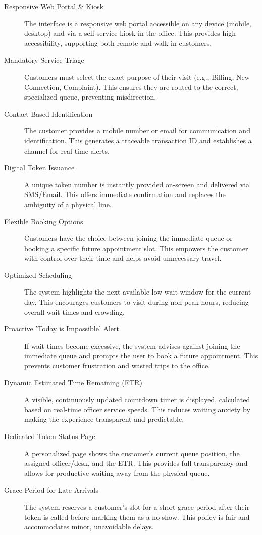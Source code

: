 \documentclass[12pt,a4paper]{report}
\begin{document}
\begin{description}
    \item[Responsive Web Portal \& Kiosk] The interface is a responsive web portal accessible on any device (mobile, desktop) and via a self-service kiosk in the office. This provides high accessibility, supporting both remote and walk-in customers.
    \item[Mandatory Service Triage] Customers must select the exact purpose of their visit (e.g., Billing, New Connection, Complaint). This ensures they are routed to the correct, specialized queue, preventing misdirection.
    \item[Contact-Based Identification] The customer provides a mobile number or email for communication and identification. This generates a traceable transaction ID and establishes a channel for real-time alerts.
    \item[Digital Token Issuance] A unique token number is instantly provided on-screen and delivered via SMS/Email. This offers immediate confirmation and replaces the ambiguity of a physical line.
    \item[Flexible Booking Options] Customers have the choice between joining the immediate queue or booking a specific future appointment slot. This empowers the customer with control over their time and helps avoid unnecessary travel.
    \item[Optimized Scheduling] The system highlights the next available low-wait window for the current day. This encourages customers to visit during non-peak hours, reducing overall wait times and crowding.
    \item[Proactive 'Today is Impossible' Alert] If wait times become excessive, the system advises against joining the immediate queue and prompts the user to book a future appointment. This prevents customer frustration and wasted trips to the office.
    \item[Dynamic Estimated Time Remaining (ETR)] A visible, continuously updated countdown timer is displayed, calculated based on real-time officer service speeds. This reduces waiting anxiety by making the experience transparent and predictable.
    \item[Dedicated Token Status Page] A personalized page shows the customer's current queue position, the assigned officer/desk, and the ETR. This provides full transparency and allows for productive waiting away from the physical queue.
    \item[Grace Period for Late Arrivals] The system reserves a customer's slot for a short grace period after their token is called before marking them as a no-show. This policy is fair and accommodates minor, unavoidable delays.

\end{description}
\end{document}
